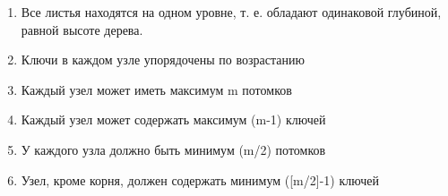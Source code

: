 \begin{enumerate}
    \item Все листья находятся на одном уровне, т. е. обладают одинаковой глубиной, равной высоте дерева. 
    \item Ключи в каждом узле упорядочены по возрастанию
    \item Каждый узел может иметь максимум m потомков
    \item Каждый узел может содержать максимум (m-1) ключей
    \item У каждого узла должно быть минимум (m/2) потомков
    \item Узел, кроме корня, должен содержать минимум ([m/2]-1) ключей
\end{enumerate}